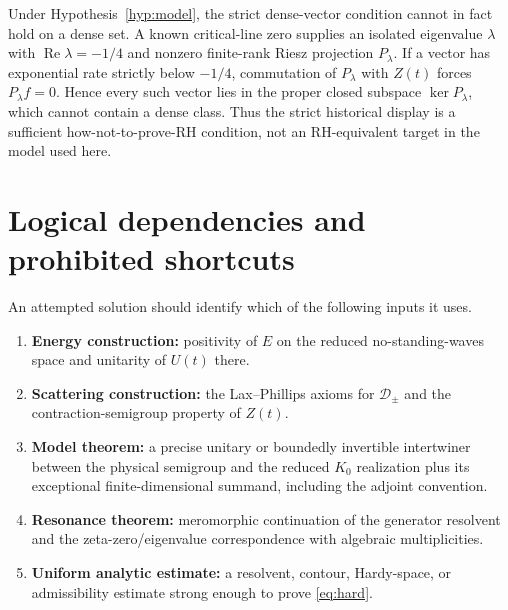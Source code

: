 \documentclass[11pt]{amsart}
\theoremstyle{definition}
\theoremstyle{remark}
\DeclareMathOperator{\Repart}{Re}
\newcommand{\Dcal}{\mathcal D}
\begin{document}
Under Hypothesis~\ref{hyp:model}, the strict dense-vector condition cannot in
fact hold on a dense set.  A known critical-line zero supplies an isolated
eigenvalue $\lambda$ with $\Repart\lambda=-1/4$ and nonzero finite-rank Riesz
projection $P_{\lambda}$.  If a vector has exponential rate strictly below
$-1/4$, commutation of $P_{\lambda}$ with $Z(t)$ forces
$P_{\lambda}f=0$.  Hence every such vector lies in the proper closed subspace
$\ker P_{\lambda}$, which cannot contain a dense class.  Thus the strict
historical display is a sufficient how-not-to-prove-RH condition, not an
RH-equivalent target in the model used here.

\section{Logical dependencies and prohibited shortcuts}

An attempted solution should identify which of the following inputs it uses.

\begin{enumerate}[label=(L\arabic*)]
 \item \textbf{Energy construction:} positivity of $E$ on the reduced
       no-standing-waves space and unitarity of $U(t)$ there.
 \item \textbf{Scattering construction:} the Lax--Phillips axioms for
       $\Dcal_{\pm}$ and the contraction-semigroup property of $Z(t)$.
 \item \textbf{Model theorem:} a precise unitary or boundedly invertible
       intertwiner between the physical semigroup and the reduced $K_{0}$
       realization plus its exceptional finite-dimensional summand, including
       the adjoint convention.
 \item \textbf{Resonance theorem:} meromorphic continuation of the generator
       resolvent and the zeta-zero/eigenvalue correspondence with algebraic
       multiplicities.
 \item \textbf{Uniform analytic estimate:} a resolvent, contour, Hardy-space,
       or admissibility estimate strong enough to prove \eqref{eq:hard}.
\end{enumerate}
\end{document}
